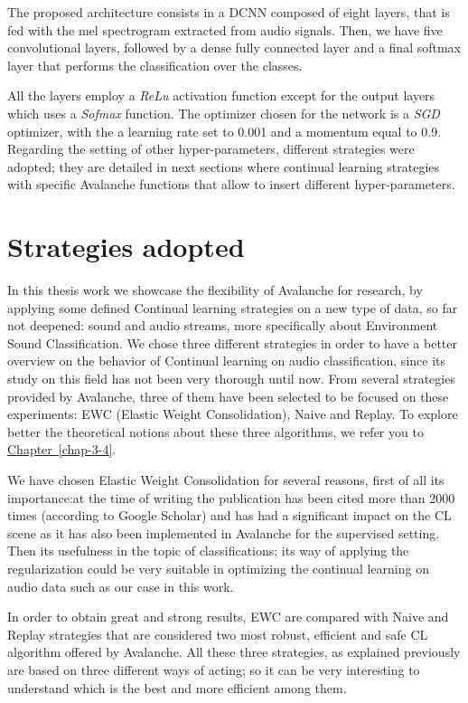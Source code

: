 \documentclass[english, LaM, oneside]{sapthesis}%
\begin{document}
The proposed architecture consists in a DCNN composed of eight layers, that is fed with the mel spectrogram extracted from audio signals.
Then, we have five convolutional layers, followed by a dense fully connected layer and a final softmax layer that performs the classification over the classes.

All the layers employ a \textit{ReLu} activation function except for the output layers which uses a \textit{Sofmax} function. The optimizer chosen for the network is a \textit{SGD} optimizer, with the a learning rate set to 0.001 and a momentum equal to 0.9. Regarding the setting of other hyper-parameters, different strategies were adopted; they are detailed in next sections where continual learning strategies with specific Avalanche functions that allow to insert different hyper-parameters.

\section{Strategies adopted}
In this thesis work we showcase the flexibility of Avalanche for research, by applying some defined Continual learning strategies on a new type of data, so far not deepened: sound and audio streams, more specifically about Environment Sound Classification. We chose three different strategies in order to have a better overview on the behavior of Continual learning on audio classification, since its study on this field has not been very thorough until now.
From several strategies provided by Avalanche, three of them have been selected to be focused on these experiments: EWC (Elastic Weight Consolidation), Naive and Replay. To explore better the theoretical notions about these three algorithms, we refer you to \hyperref[chap-3-4]{Chapter~\ref*{chap-3-4}}.

We have chosen Elastic Weight Consolidation for several reasons, first of all its importance:at the time of writing the publication has been cited more than 2000 times (according to Google Scholar) and has had a significant impact on the CL scene as it has also been implemented in Avalanche for the supervised setting.
Then its usefulness in the topic of classifications; its way of applying the regularization could be very suitable in optimizing the continual learning on audio data such as our case in this work.

\vspace{5mm}
In order to obtain great and strong results, EWC are compared with Naive and Replay strategies that are considered two most robust, efficient and safe CL algorithm offered by Avalanche. All these three strategies, as explained previously are based on three different ways of acting; so it can be very interesting to understand which is the best and more efficient among them. 
\end{document}
